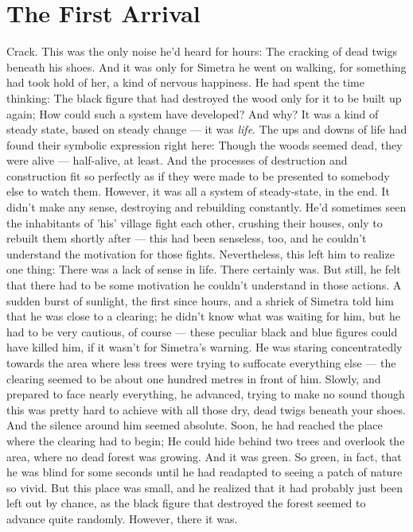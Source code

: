 \chapter{The First Arrival}
\label{cha:first-arrival}
Crack. 
This was the only noise he'd heard for hours: The cracking of dead twigs beneath his shoes. And it was only for Simetra he went on walking, for something had took hold of her, a kind of nervous happiness. 
He had spent the time thinking: The black figure that had destroyed the wood only for it to be built up again; How could such a system have developed? And why? 
It was a kind of steady state, based on steady change --- it was \emph{life}. The ups and downs of life had found their symbolic expression right here: Though the woods seemed dead, they were alive --- half-alive, at least. And the processes of destruction and construction fit so perfectly as if they were made to be presented to somebody else to watch them. 
However, it was all a system of steady-state, in the end. It didn't make any sense, destroying and rebuilding constantly. He'd sometimes seen the inhabitants of 'his' village fight each other, crushing their houses, only to rebuilt them shortly after --- this had been senseless, too, and he couldn't understand the motivation for those fights. 
Nevertheless, this left him to realize one thing: There was a lack of sense in life. 
There certainly was. 
But still, he felt that there had to be some motivation he couldn't understand in those actions. 
A sudden burst of sunlight, the first since hours, and a shriek of Simetra told him that he was close to a clearing; he didn't know what was waiting for him, but he had to be very cautious, of course --- these peculiar black and blue figures could have killed him, if it wasn't for Simetra's warning. 
He was staring concentratedly towards the area where less trees were trying to suffocate everything else --- the clearing seemed to be about one hundred metres in front of him. 
Slowly, and prepared to face nearly everything, he advanced, trying to make no sound though this was pretty hard to achieve with all those dry, dead twigs beneath your shoes. And the silence around him seemed absolute. 
Soon, he had reached the place where the clearing had to begin; He could hide behind two trees and overlook the area, where no dead forest was growing. And it was green. 
So green, in fact, that he was blind for some seconds until he had readapted to seeing a patch of nature so vivid. But this place was small, and he realized that it had probably just been left out by chance, as the black figure that destroyed the forest seemed to advance quite randomly. However, there it was. 
